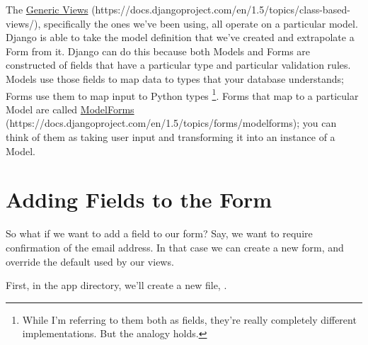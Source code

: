 \documentclass[letterpaper,10pt,english]{sphinxmanual}
\begin{document}
The \href{https://docs.djangoproject.com/en/1.5/topics/class-based-views/}{Generic Views} (https://docs.djangoproject.com/en/1.5/topics/class-based-views/), specifically the ones we've been using, all
operate on a particular model. Django is able to take the model
definition that we've created and extrapolate a Form from it. Django
can do this because both Models and Forms are constructed of fields
that have a particular type and particular validation rules. Models
use those fields to map data to types that your database understands;
Forms use them to map input to Python types \footnote{
While I'm referring to them both as fields, they're really
completely different implementations. But the analogy holds.
}. Forms that map to a
particular Model are called \href{https://docs.djangoproject.com/en/1.5/topics/forms/modelforms}{ModelForms} (https://docs.djangoproject.com/en/1.5/topics/forms/modelforms); you can think of them as
taking user input and transforming it into an instance of a Model.


\section{Adding Fields to the Form}
\label{tutorial/forms:adding-fields-to-the-form}
So what if we want to add a field to our form? Say, we want to require
confirmation of the email address. In that case we can create a new
form, and override the default used by our views.

First, in the  app directory, we'll create a new file,
.
\end{document}
